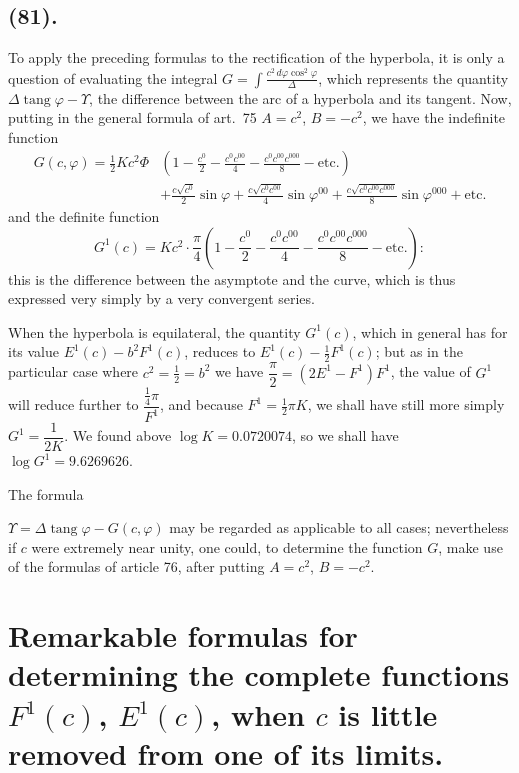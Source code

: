 \documentclass{article}
\begin{document}
\subsection*{(81).}

To apply the preceding formulas to the rectification of the hyperbola, it is only a question of evaluating the integral $G=\displaystyle\int\frac{c^{2}\,d\varphi\cos^{2}\varphi}{\Delta}$, which represents the quantity $\Delta\operatorname{tang}\varphi-\Upsilon$, the difference between the arc of a hyperbola and its tangent. Now, putting in the general formula of art.~75 $A=c^{2}$, $B=-c^{2}$, we have the indefinite function
\[ \begin{aligned} G(c,\varphi)=\tfrac{1}{2}Kc^{2}\Phi&\left(1-\frac{c^{0}}{2}-\frac{c^{0}c^{00}}{4}-\frac{c^{0}c^{00}c^{000}}{8}-\text{etc.}\right)\\ &+\frac{c\sqrt{c^{0}}}{2}\sin\varphi+\frac{c\sqrt{c^{0}c^{00}}}{4}\sin\varphi^{00}+\frac{c\sqrt{c^{0}c^{00}c^{000}}}{8}\sin\varphi^{000}+\text{etc.} \end{aligned} \]
and the definite function
\[ G^{1}(c)=Kc^{2}\cdot\frac{\pi}{4}\left(1-\frac{c^{0}}{2}-\frac{c^{0}c^{00}}{4}-\frac{c^{0}c^{00}c^{000}}{8}-\text{etc.}\right): \]
this is the difference between the asymptote and the curve, which is thus expressed very simply by a very convergent series.

When the hyperbola is equilateral, the quantity $G^{1}(c)$, which in general has for its value $E^{1}(c)-b^{2}F^{1}(c)$, reduces to $E^{1}(c)-\frac{1}{2}F^{1}(c)$; but as in the particular case where $c^{2}=\frac{1}{2}=b^{2}$ we have $\dfrac{\pi}{2}=(2E^{1}-F^{1})F^{1}$, the value of $G^{1}$ will reduce further to $\dfrac{\frac{1}{4}\pi}{F^{1}}$, and because $F^{1}=\frac{1}{2}\pi K$, we shall have still more simply $G^{1}=\dfrac{1}{2K}$. We found above $\log K=0.0720074$, so we shall have $\log G^{1}=9.6269626$.

The formula

$\Upsilon=\Delta\operatorname{tang}\varphi-G(c,\varphi)$ may be regarded as applicable to all cases; nevertheless if $c$ were extremely near unity, one could, to determine the function $G$, make use of the formulas of article 76, after putting $A=c^{2}$, $B=-c^{2}$.

\section*{Remarkable formulas for determining the complete functions $F^{1}(c)$, $E^{1}(c)$, when $c$ is little removed from one of its limits.}
\end{document}
